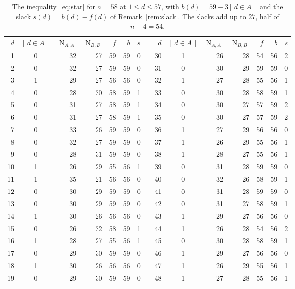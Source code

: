 \documentclass[11pt]{amsart}
\theoremstyle{definition}
\theoremstyle{remark}
\numberwithin{equation}{section}
\newcommand{\NN}{\operatorname{N}}
\newcommand{\ind}[1]{[\,#1\,]}
\begin{document}
\begin{table}[t]
\centering
\small
\setlength{\tabcolsep}{4.2pt}
\caption{The inequality~\eqref{eq:star} for $n=58$ at $1\le d\le57$, with $b(d)=59-3\ind{d\in A}$ and the slack $s(d)=b(d)-f(d)$ of Remark~\ref{rem:slack}. The slacks add up to $27$, half of $n-4=54$.}
\label{tab:main}
\begin{tabular}{r c r r r r r c r c r r r r r}
\toprule
$d$ & $\ind{d\in A}$ & $\NN_{A,A}$ & $\NN_{B,B}$ & $f$ & $b$ & $s$ & & $d$ & $\ind{d\in A}$ & $\NN_{A,A}$ & $\NN_{B,B}$ & $f$ & $b$ & $s$\\
\cmidrule{1-7}\cmidrule{9-15}
1 & 0 & 32 & 27 & 59 & 59 & 0 && 30 & 1 & 26 & 28 & 54 & 56 & 2\\
2 & 0 & 32 & 27 & 59 & 59 & 0 && 31 & 0 & 30 & 29 & 59 & 59 & 0\\
3 & 1 & 29 & 27 & 56 & 56 & 0 && 32 & 1 & 27 & 28 & 55 & 56 & 1\\
4 & 0 & 28 & 30 & 58 & 59 & 1 && 33 & 0 & 30 & 28 & 58 & 59 & 1\\
5 & 0 & 31 & 27 & 58 & 59 & 1 && 34 & 0 & 30 & 27 & 57 & 59 & 2\\
6 & 0 & 31 & 27 & 58 & 59 & 1 && 35 & 0 & 30 & 27 & 57 & 59 & 2\\
7 & 0 & 33 & 26 & 59 & 59 & 0 && 36 & 1 & 27 & 29 & 56 & 56 & 0\\
8 & 0 & 32 & 27 & 59 & 59 & 0 && 37 & 1 & 26 & 29 & 55 & 56 & 1\\
9 & 0 & 28 & 31 & 59 & 59 & 0 && 38 & 1 & 28 & 27 & 55 & 56 & 1\\
10 & 1 & 26 & 29 & 55 & 56 & 1 && 39 & 0 & 31 & 28 & 59 & 59 & 0\\
11 & 1 & 35 & 21 & 56 & 56 & 0 && 40 & 0 & 32 & 26 & 58 & 59 & 1\\
12 & 0 & 30 & 29 & 59 & 59 & 0 && 41 & 0 & 31 & 28 & 59 & 59 & 0\\
13 & 0 & 30 & 29 & 59 & 59 & 0 && 42 & 0 & 31 & 27 & 58 & 59 & 1\\
14 & 1 & 30 & 26 & 56 & 56 & 0 && 43 & 1 & 29 & 27 & 56 & 56 & 0\\
15 & 0 & 26 & 32 & 58 & 59 & 1 && 44 & 1 & 26 & 28 & 54 & 56 & 2\\
16 & 1 & 28 & 27 & 55 & 56 & 1 && 45 & 0 & 30 & 28 & 58 & 59 & 1\\
17 & 0 & 29 & 30 & 59 & 59 & 0 && 46 & 1 & 29 & 27 & 56 & 56 & 0\\
18 & 1 & 30 & 26 & 56 & 56 & 0 && 47 & 1 & 26 & 29 & 55 & 56 & 1\\
19 & 0 & 29 & 30 & 59 & 59 & 0 && 48 & 1 & 27 & 28 & 55 & 56 & 1\\

\end{tabular}
\end{table}
\end{document}
